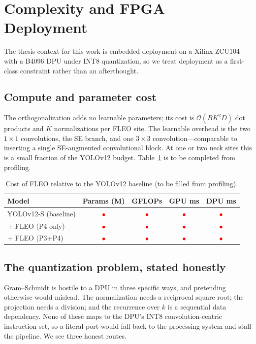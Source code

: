 \documentclass[journal]{IEEEtran}
\newcommand{\pending}{\textcolor{red}{$\bullet$}}
\begin{document}
\section{Complexity and FPGA Deployment}\label{sec:fpga}
The thesis context for this work is embedded deployment on a Xilinx ZCU104
with a B4096 DPU under INT8 quantization, so we treat deployment as a
first-class constraint rather than an afterthought.

\subsection{Compute and parameter cost}
The orthogonalization adds no learnable parameters; its cost is
$\mathcal{O}(BK^2D)$ dot products and $K$ normalizations per FLEO site. The
learnable overhead is the two $1\times1$ convolutions, the SE branch, and one
$3\times3$ convolution---comparable to inserting a single SE-augmented
convolutional block. At one or two neck sites this is a small fraction of the
YOLOv12 budget. Table~\ref{tab:cost} is to be completed from profiling.

\begin{table}[t]
\caption{Cost of FLEO relative to the YOLOv12 baseline (to be filled from
profiling).}
\label{tab:cost}
\centering
\begin{tabular}{lcccc}
\toprule
Model & Params (M) & GFLOPs & GPU ms & DPU ms \\
\midrule
YOLOv12-S (baseline) & \pending & \pending & \pending & \pending \\
\quad + FLEO (P4 only) & \pending & \pending & \pending & \pending \\
\quad + FLEO (P3{+}P4) & \pending & \pending & \pending & \pending \\
\bottomrule
\end{tabular}
\end{table}

\subsection{The quantization problem, stated honestly}
Gram--Schmidt is hostile to a DPU in three specific ways, and pretending
otherwise would mislead. The normalization needs a reciprocal square root; the
projection needs a division; and the recurrence over $k$ is a sequential data
dependency. None of these maps to the DPU's INT8 convolution-centric
instruction set, so a literal port would fall back to the processing system
and stall the pipeline. We see three honest routes.
\end{document}
